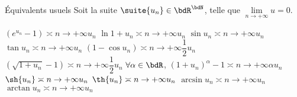 \documentclass[a4paper,french,bookmarks]{article}
\begin{document}
\begin{theorem}{Équivalents usuels}{}
    Soit la suite $\suite{u_n} \in \bdR^\bdN$, telle que $\lim\limits_{n \to +\infty} u = 0$.
    \begin{enumerate}
    \begin{multicols}{2}

        \itarr $\left(e^{u_n} -1\right) \asymp{n \to +\infty} u_n$
        \itarr $\ln{1+u_n} \asymp{n \to +\infty} u_n$
        \itarr $\sin{u_n} \asymp{n \to +\infty} u_n$
        \itarr $\tan{u_n}\asymp{n \to +\infty} u_n$
        \itarr $\left(1-\cos{u_n}\right) \asymp{n \to +\infty} \dfrac{1}{2}u_n$
        \itarr $\left(\sqrt{1+u_n} -1\right) \asymp{n \to +\infty} \dfrac{1}{2}u_n$
        \itarr $\forall \alpha \in \bdR$, $\left(1+u_n\right)^\alpha -1 \asymp{n \to +\infty} \alpha u_n$
        \itarr $\sh{u_n} \asymp{n \to +\infty} u_n$
        \itarr $\th{u_n} \asymp{n \to +\infty} u_n$
        \itarr $\arcsin{u_n} \asymp{n \to +\infty} u_n$
        \itarr $\arctan{u_n} \asymp{n \to +\infty} u_n$
    \end{multicols}
    \end{enumerate}
\end{theorem}
\end{document}
